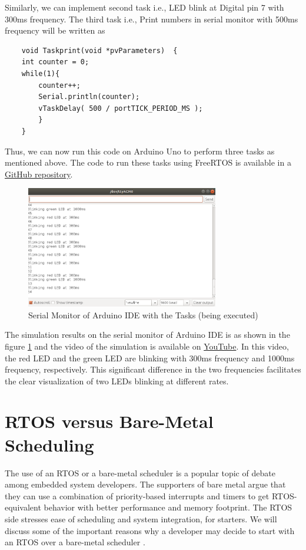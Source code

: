\documentclass[12pt]{report}
\begin{document}
Similarly, we can implement second task i.e., LED blink at Digital pin 7 with 300ms frequency. The third task i.e., Print numbers in serial monitor with 500ms frequency will be written as
\begin{verbatim}
    void Taskprint(void *pvParameters)  {
    int counter = 0;
    while(1){
        counter++;
        Serial.println(counter);
        vTaskDelay( 500 / portTICK_PERIOD_MS ); 
    	}
    }
\end{verbatim}

Thus, we can now run this code on Arduino Uno to perform three tasks as mentioned above. The code to run these tasks using FreeRTOS is available in a \href{https://github.com/SudhakarKuma/MTech_Seminar_June_2020/tree/master/FreeRTOS_Arduino_codes}{GitHub repository}. 

\begin{figure}[h]
\centering
\includegraphics[width=0.75\textwidth]{images/Arduino-ide-tasks.png}
\caption{Serial Monitor of Arduino IDE with the Tasks (being executed)}
\label{fig:arduino-leds-serial-mon}
\end{figure}


The simulation results on the serial monitor of Arduino IDE is as shown in the figure \ref{fig:arduino-leds-serial-mon} and the video of the simulation is available on \href{https://youtu.be/SBuHO7kwZ0Y}{YouTube}. In this video, the red LED and the green LED are blinking with 300ms frequency and 1000ms frequency, respectively. This significant difference in the two frequencies facilitates the clear visualization of two LEDs blinking at different rates.  


\section{RTOS versus Bare-Metal Scheduling}
The use of an RTOS or a bare-metal scheduler is a popular topic of debate among embedded system developers. The supporters of bare metal argue that they can use a combination of priority-based interrupts and timers to get RTOS-equivalent behavior with better performance and memory footprint. The RTOS side stresses ease of scheduling and system integration, for starters. We will discuss some of the important reasons why a developer may decide to start with an RTOS over a bare-metal scheduler \cite{rtos-need}. 
\end{document}
